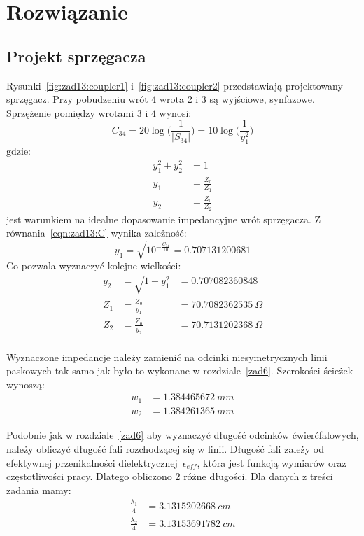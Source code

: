 \documentclass[rep.tex]{subfiles}
\begin{document}
\section{Rozwiązanie}
\subsection{Projekt sprzęgacza}
Rysunki~\ref{fig:zad13:coupler1} i~\ref{fig:zad13:coupler2} przedstawiają projektowany sprzęgacz.
Przy pobudzeniu wrót 4 wrota 2 i 3 są wyjściowe, synfazowe.
Sprzężenie pomiędzy wrotami $3$ i $4$ wynosi:
\begin{equation}
  C_{34} = 20 \log\Big( \frac{1}{|S_{34}|}\Big) = 10 \log\Big( \frac{1}{y_1^2}\Big) \label{eqn:zad13:C}
\end{equation}
gdzie:
\begin{align}
  y_1^2 + y_2^2 &= 1 \\
  y_1 &= \frac{Z_0}{Z_1} \\
  y_2 &= \frac{Z_0}{Z_2}
\end{align}
jest warunkiem na idealne dopasowanie impedancyjne wrót sprzęgacza.
Z równania~\ref{eqn:zad13:C} wynika zależność:
\begin{equation}
  y_1 = \sqrt{10^{-\frac{C_{34}}{10}}} = 0.707131200681
\end{equation}
Co pozwala wyznaczyć kolejne wielkości:
\begin{align}
  y_2 &= \sqrt{1 - y_1^2} &= 0.707082360848\\
  Z_1 &= \frac{Z_0}{y_1} &= 70.7082362535~\Omega \\
  Z_2 &= \frac{Z_0}{y_2} &= 70.7131202368~\Omega \\
\end{align}

Wyznaczone impedancje należy zamienić na odcinki niesymetrycznych linii paskowych tak samo jak było to wykonane w rozdziale~\ref{zad6}.
Szerokości ścieżek wynoszą:
\begin{align}
  w_1 &= 1.384465672~mm \nonumber \\
  w_2 &= 1.384261365~mm \nonumber
\end{align}

Podobnie jak w rozdziale~\ref{zad6} aby wyznaczyć długość odcinków ćwierćfalowych, należy obliczyć długość fali rozchodzącej się w linii.
Długość fali zależy od efektywnej przenikalności dielektrycznej~$\epsilon_{eff}$, która jest funkcją wymiarów oraz częstotliwości pracy.
Dlatego obliczono 2 różne długości.
Dla danych z treści zadania mamy:
\begin{align}
  \frac{\lambda_1}{4} &= 3.1315202668~cm \nonumber \\
  \frac{\lambda_2}{4} &= 3.13153691782~cm \nonumber
\end{align}
\end{document}
